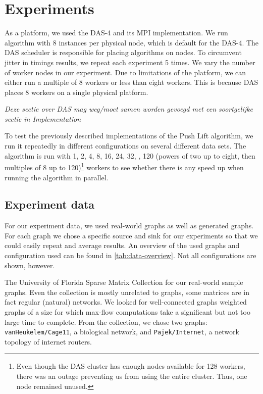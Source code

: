\chapter{Experiments}
\label{chp:experiments}

As a platform, we used the DAS-4 and its MPI implementation. We run algorithm with 8 instances per physical node, which is default for the DAS-4.
The DAS scheduler is responsible for placing algorithms on nodes. To circumvent jitter in timings results, we repeat each experiment 5 times. We vary the number of worker nodes in our experiment. Due to limitations of the platform, we can either run a multiple of 8 workers or less than eight workers. This is because DAS places 8 workers on a single physical platform.

\emph{Deze sectie over DAS mag weg/moet samen worden gevoegd met een soortgelijke sectie in Implementation}

To test the previously described implementations of the Push Lift algorithm, we run it repeatedly in different configurations on several different data sets. The algorithm is run with 1, 2, 4, 8, 16, 24, 32, \textellipsis, 120 (powers of two up to eight, then multiples of 8 up to 120)\footnote{Even though the DAS cluster has enough nodes available for 128 workers, there was an outage preventing us from using the entire cluster. Thus, one node remained unused.} workers to see whether there is any speed up when running the algorithm in parallel.

\section{Experiment data}
For our experiment data, we used real-world graphs as well as generated graphs. For each graph we chose a specific source and sink for our experiments so that we could easily repeat and average results. An overview of the used graphs and configuration used can be found in \autoref{tab:data-overview}. Not all configurations are shown, however.

The University of Florida Sparse Matrix Collection \cite{FloridaSparseMatrix} for our real-world sample graphs. Even the collection is mostly unrelated to graphs, some matrices are in fact regular (natural) networks. We looked for well-connected graphs weighted graphs of a size for which max-flow computations take a significant but not too large time to complete. From the collection, we chose two graphs: \texttt{vanHeukelem/Cage11}, a biological network, and \texttt{Pajek/Internet}, a network topology of internet routers.

